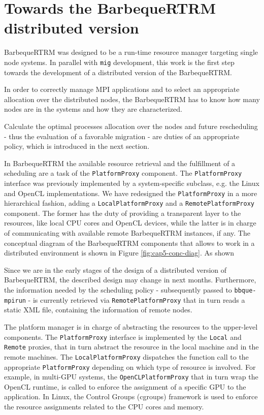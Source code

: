 \section{Towards the BarbequeRTRM distributed version}
BarbequeRTRM was designed  to be a run-time resource manager targeting
single node systems. In parallel with \texttt{mig} development, this work is
the first step towards the development of a distributed
version of the BarbequeRTRM.

In order to correctly manage MPI applications and to
select an appropriate allocation over the distributed nodes, the BarbequeRTRM
has to know how many nodes are in the systems and how they are characterized.

Calculate the optimal processes allocation over the nodes and future
rescheduling - thus the evaluation of a favorable migration - are duties of an
appropriate policy, which is introduced in the next section.

In BarbequeRTRM the available resource retrieval and the fulfillment of a
scheduling are a task of the \texttt{PlatformProxy} component.
The \linebreak \texttt{PlatformProxy}
interface was previously implemented by a system-specific subclass, e.g.
the Linux and OpenCL implementations.
We have redesigned the 
\texttt{PlatformProxy} in a more hierarchical fashion, adding a \linebreak 
\texttt{LocalPlatformProxy} and a
\texttt{RemotePlatformProxy} component. The former has the duty of providing a
transparent
layer to the resources, like local CPU cores and OpenCL devices, while the latter is in charge of
communicating with available remote BarbequeRTRM instances, if any. 
The conceptual diagram of the BarbequeRTRM components that allows to
work in a distributed environment is shown in Figure \ref{fig:cap5-conc-diag}.
As shown 


Since we are in the early stages of the design of a distributed version of
BarbequeRTRM, the described design may change in next months. Furthermore, the
information needed by the scheduling policy - subsequently passed to
\texttt{bbque-mpirun} - is currently retrieved via
\texttt{RemotePlatformProxy} that in turn reads a static XML file,
containing the information of remote nodes.


The platform manager is in charge of abstracting the resources to the
upper-level components. The \texttt{PlatformProxy} interface is implemented
by the \linebreak \texttt{Local} and \texttt{Remote} proxies, that in turn abstract the
resource in the local machine and in the remote machines. The
\texttt{LocalPlatformProxy} dispatches the function call to the appropriate
\texttt{PlatformProxy} depending on which type of resource is involved.
For example, in multi-GPU systems, the \linebreak \texttt{OpenCLPlatformProxy}
that in turn wrap the OpenCL runtime, is called to enforce the assignment of
a specific GPU to the application. In Linux, the Control Groups (cgroups)
framework is used to enforce the resource assignments related to the CPU cores and memory\cite{bellasi2015effective}.

